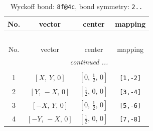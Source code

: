 \documentclass[fleqn,8pt]{jsarticle}
\begin{document}
\renewcommand{\arraystretch}{1.2}
\begin{longtable}{cccc}
\caption{Wyckoff bond: {\tt 8f@4c}, bond symmetry: {\tt 2..}}
 \\
 \hline \hline
No. & vector & center & mapping \\ \hline \endfirsthead

\multicolumn{3}{l}{\tablename\ \thetable{}} \\
 \hline \hline
No. & vector & center & mapping \\ \hline \endhead

 \hline \hline
\multicolumn{3}{r}{\footnotesize\it continued ...} \\ \endfoot

 \hline \hline
\multicolumn{3}{r}{} \\ \endlastfoot

1 & $\left[ X,\, Y,\, 0 \right]$ & $\left[ 0,\, \frac{1}{2},\, 0 \right]$ & {\tt [1,-2]} \\ \hline
2 & $\left[ Y,\, - X,\, 0 \right]$ & $\left[ \frac{1}{2},\, 0,\, 0 \right]$ & {\tt [3,-4]} \\ \hline
3 & $\left[ - X,\, Y,\, 0 \right]$ & $\left[ 0,\, \frac{1}{2},\, 0 \right]$ & {\tt [5,-6]} \\ \hline
4 & $\left[ - Y,\, - X,\, 0 \right]$ & $\left[ \frac{1}{2},\, 0,\, 0 \right]$ & {\tt [7,-8]} \\
\end{longtable}
\renewcommand{\arraystretch}{1.2}
\end{document}
